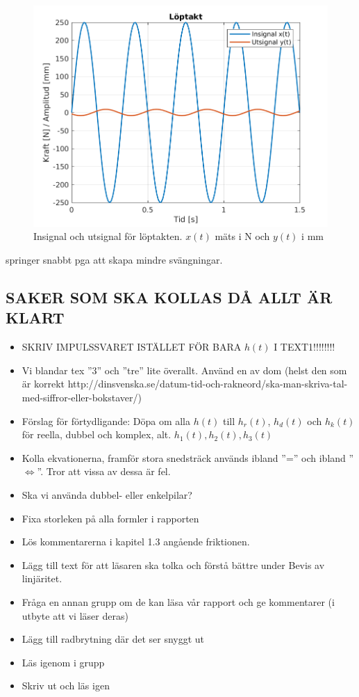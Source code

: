 \newpage

\begin{figure}[H]
    \centering
     \includegraphics[scale=0.9]{bilder/sinusfunktion_loptakt}
    \caption{Insignal och utsignal för löptakten. $x(t)$ mäts i N och $y(t)$ i mm}
    \label{fig:sinusfunktion_loptakt}
\end{figure}
springer snabbt pga att skapa mindre svängningar.

\newpage
\subsection{SAKER SOM SKA KOLLAS DÅ ALLT ÄR KLART}
\begin{itemize}
    \item SKRIV IMPULSSVARET ISTÄLLET FÖR BARA $h(t)$ I TEXT1!!!!!!!!
    \item Vi blandar tex ''3'' och ''tre'' lite överallt. Använd en av dom (helst den som är korrekt http://dinsvenska.se/datum-tid-och-rakneord/ska-man-skriva-tal-med-siffror-eller-bokstaver/)
    \item Förslag för förtydligande: Döpa om alla $h(t)$ till $h_r(t)$, $h_d(t)$  och $h_k(t)$ för reella, dubbel och komplex, alt. $h_1(t), h_2(t), h_3(t)$
    \item Kolla ekvationerna, framför stora snedsträck används ibland ''='' och ibland ''$\Longleftrightarrow$''. Tror att vissa av dessa är fel.
    \item Ska vi använda dubbel- eller enkelpilar? 
    \item Fixa storleken på alla formler i rapporten
    \item Lös kommentarerna i kapitel 1.3 angående friktionen.
    \item Lägg till text för att läsaren ska tolka och förstå bättre under Bevis av linjäritet.
    \item Fråga en annan grupp om de kan läsa vår rapport och ge kommentarer (i utbyte att vi läser deras)
    \item Lägg till radbrytning där det ser snyggt ut
    \item Läs igenom i grupp
    \item Skriv ut och läs igen
\end{itemize}